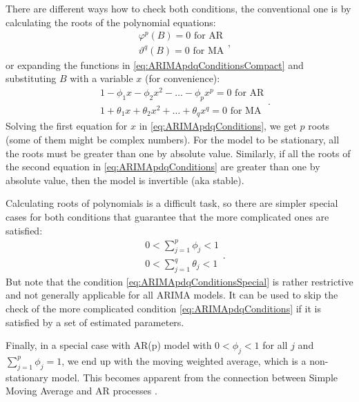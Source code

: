 \documentclass[
]{book}
\theoremstyle{definition}
\theoremstyle{definition}
\theoremstyle{definition}
\theoremstyle{definition}
\theoremstyle{remark}
\begin{document}
There are different ways how to check both conditions, the conventional one is by calculating the roots of the polynomial equations:
\begin{equation}
\begin{aligned}
  & \varphi^p(B) = 0 \text{ for AR} \\
  & \vartheta^q(B) = 0 \text{ for MA}
\end{aligned} ,
  \label{eq:ARIMApdqConditionsCompact}
\end{equation}
or expanding the functions in \eqref{eq:ARIMApdqConditionsCompact} and substituting \(B\) with a variable \(x\) (for convenience):
\begin{equation}
\begin{aligned}
  & 1 -\phi_1 x -\phi_2 x^2 -\dots -\phi_p x^p = 0 \text{ for AR} \\
  & 1 + \theta_1 x + \theta_2 x^2 + \dots + \theta_q x^q = 0 \text{ for MA}
\end{aligned} .
  \label{eq:ARIMApdqConditions}
\end{equation}
Solving the first equation for \(x\) in \eqref{eq:ARIMApdqConditions}, we get \(p\) roots (some of them might be complex numbers). For the model to be stationary, all the roots must be greater than one by absolute value. Similarly, if all the roots of the second equation in \eqref{eq:ARIMApdqConditions} are greater than one by absolute value, then the model is invertible (aka stable).

Calculating roots of polynomials is a difficult task, so there are simpler special cases for both conditions that guarantee that the more complicated ones are satisfied:
\begin{equation}
\begin{aligned}
  & 0 < \sum_{j=1}^p \phi_j < 1 \\
  & 0 < \sum_{j=1}^q \theta_j < 1
\end{aligned} .
  \label{eq:ARIMApdqConditionsSpecial}
\end{equation}
But note that the condition \eqref{eq:ARIMApdqConditionsSpecial} is rather restrictive and not generally applicable for all ARIMA models. It can be used to skip the check of the more complicated condition \eqref{eq:ARIMApdqConditions} if it is satisfied by a set of estimated parameters.

Finally, in a special case with AR(p) model with \(0 < \phi_j < 1\) for all \(j\) and \(\sum_{j=1}^p \phi_j = 1\), we end up with the moving weighted average, which is a non-stationary model. This becomes apparent from the connection between Simple Moving Average and AR processes \citep{Svetunkov2017}.
\end{document}
